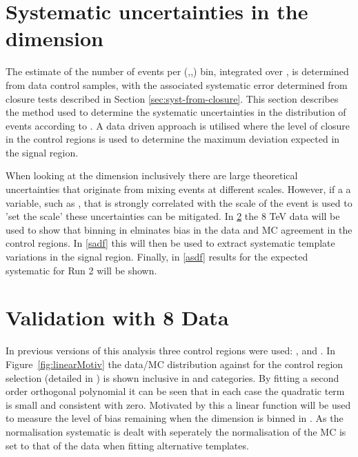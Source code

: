 \section{Systematic uncertainties in the \mht dimension}
\label{sec:mhtTemplate}

The estimate of the number of events per (\njet,\nb,\scalht) bin,
integrated over \mht, is determined from data control samples, with
the associated systematic error determined from closure tests
described in Section \ref{sec:syst-from-closure}. This section
describes the method used to determine the systematic uncertainties in
the distribution of events according to \mht. A data driven approach is
utilised where the level of closure in the control regions is used
to determine the maximum deviation expected in the signal region.

When looking at the \mht dimension inclusively there are
large theoretical uncertainties that originate from mixing events
at different scales. However, if a a variable, such as \ht, 
that is strongly correlated with the scale of the event 
is used to 'set the scale' these uncertainties can be mitigated.
In \ref{valid8} the 8 TeV data will be used to show that binning in
\ht elminates bias in the data and MC agreement in the control regions. 
In \ref{sadf} this will then be used to extract systematic template 
variations in the signal region. Finally, in \ref{asdf} results for the
expected systematic for Run 2 will be shown.



\section{Validation with 8 \TeV Data}
\label{valid8}
In previous versions of this analysis three control regions
were used: \mj, \mmj and \gj. In Figure~\ref{fig:linearMotiv} the data/MC 
distribution against \mht for the control region selection 
(detailed in \cite{CMS_AN_2013-366}) is shown inclusive 
in \ht and categories. By fitting a second order orthogonal polynomial
it can be seen that in each case the quadratic term is small and consistent
with zero. Motivated by this a linear function will be used to measure
the level of bias remaining when the \mht dimension is binned in \mht. 
As the normalisation systematic is dealt with seperately the normalisation
of the MC is set to that of the data when fitting alternative templates.


